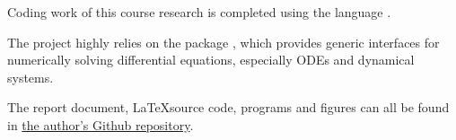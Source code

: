 \documentclass[UTF8,a4paper,11pt]{ctexart}
\begin{document}
Coding work of this course research is completed using the  language \cite{julialang}.

The project highly relies on the package  \cite{DifferentialEquations}, which provides generic interfaces for numerically solving differential equations, especially ODEs and dynamical systems.

The report document, \LaTeX source code, programs and figures can all be found in \textcolor{blue}{\href{https://github.com/PDE2718/STPHY2023}{the author's Github repository}}.

\newpage
\printbibliography















\end{document}
